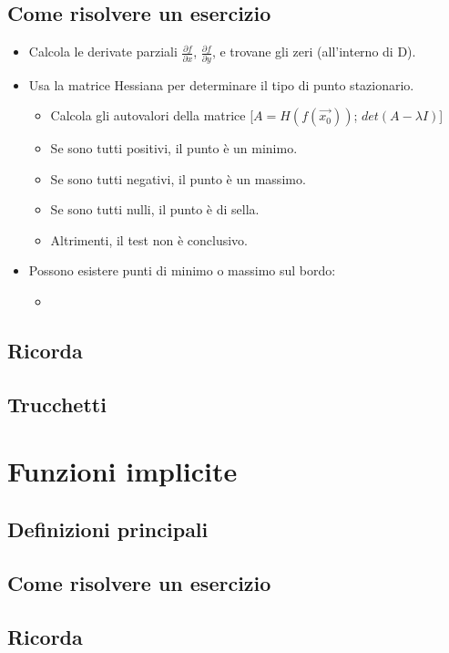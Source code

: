 \documentclass[a4paper,10pt]{book}
\begin{document}
\subsection{Come risolvere un esercizio}
\begin{itemize}
\item Calcola le derivate parziali $\frac{\partial f}{\partial x}$, $\frac{\partial f}{\partial y}$, e trovane gli zeri (all'interno di D).
\item Usa la matrice Hessiana per determinare il tipo di punto stazionario.
\begin{itemize}
 \item Calcola gli autovalori della matrice [$A = H(f(\vec{x_0}))$; $det(A-\lambda I)$]
 \item Se sono tutti positivi, il punto è un minimo.
 \item Se sono tutti negativi, il punto è un massimo.
 \item Se sono tutti nulli, il punto è di sella.
 \item Altrimenti, il test non è conclusivo.
\end{itemize}
\item Possono esistere punti di minimo o massimo sul bordo:
\begin{itemize}
 \item
\end{itemize}
\end{itemize}

\subsection{Ricorda}
\subsection{Trucchetti}

\section{Funzioni implicite}
\subsection{Definizioni principali}

\subsection{Come risolvere un esercizio}

\subsection{Ricorda}
\end{document}
